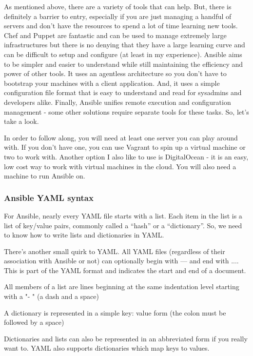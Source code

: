 \documentclass[BTech]{srmuthesis}
\begin{document}
As mentioned above, there are a variety of tools that can help. But, there is definitely a barrier to entry, especially if you are just managing a handful of servers and don’t have the resources to spend a lot of time learning new tools. Chef and Puppet are fantastic and can be used to manage extremely large infrastructures but there is no denying that they have a large learning curve and can be difficult to setup and configure (at least in my experience). Ansible aims to be simpler and easier to understand while still maintaining the efficiency and power of other tools. It uses an agentless architecture so you don’t have to bootstrap your machines with a client application. And, it uses a simple configuration file format that is easy to understand and read for sysadmins and developers alike. Finally, Ansible unifies remote execution and configuration management - some other solutions require separate tools for these tasks. So, let’s take a look.

In order to follow along, you will need at least one server you can play around with. If you don’t have one, you can use Vagrant to spin up a virtual machine or two to work with. Another option I also like to use is DigitalOcean - it is an easy, low cost way to work with virtual machines in the cloud. You will also need a machine to run Ansible on. 

\subsubsection{Ansible YAML syntax}

For Ansible, nearly every YAML file starts with a list. Each item in the list is a list of key/value pairs, commonly called a “hash” or a “dictionary”. So, we need to know how to write lists and dictionaries in YAML.

There’s another small quirk to YAML. All YAML files (regardless of their association with Ansible or not) can optionally begin with --- and end with .... This is part of the YAML format and indicates the start and end of a document.

All members of a list are lines beginning at the same indentation level starting with a "- " (a dash and a space)

A dictionary is represented in a simple key: value form (the colon must be followed by a space)

Dictionaries and lists can also be represented in an abbreviated form if you really want to. YAML also supports dictionaries which map keys to values.
\end{document}
